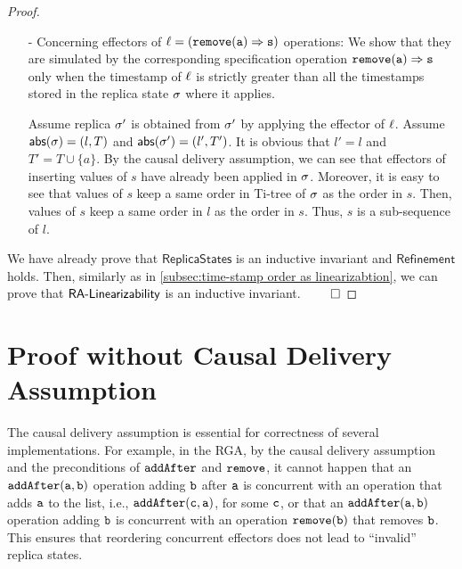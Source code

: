\begin {proof}
\begin{itemize}
\item[-] Concerning effectors of $\alabel = (\alabellong[{\tt remove}]{a}{s}{})$ operations: We show that they are simulated by the corresponding specification operation $\alabellong[{\tt remove}]{a}{s}{}$ only when the timestamp of $\ell$ is strictly greater than all the timestamps stored in the replica state $\sigma$ where it applies.

    Assume replica $\sigma'$ is obtained from $\sigma'$ by applying the effector of $\ell$. Assume $\mathsf{abs}(\sigma) = (l,T)$ and $\mathsf{abs}(\sigma') = (l',T')$. It is obvious that $l' = l$ and $T' = T \cup \{ a \}$. By the causal delivery assumption, we can see that effectors of inserting values of $s$ have already been applied in $\sigma$. Moreover, it is easy to see that values of $s$ keep a same order in Ti-tree of $\sigma$ as the order in $s$. Then, values of $s$ keep a same order in $l$ as the order in $s$. Thus, $s$ is a sub-sequence of $l$.
\end{itemize}

We have already prove that $\mathsf{ReplicaStates}$ is an inductive invariant and $\mathsf{Refinement}$ holds. Then, similarly as in \sectionautorefname \ref{subsec:time-stamp order as linearizabtion}, we can prove that $\mathsf{RA\text{-}Linearizability{}}$ is an inductive invariant. $\qed$
\end {proof}





\section{\crdtlin{} Proof without Causal Delivery Assumption}
\label{sec:RA-linearizability proof without causal delivery assumption}

The causal delivery assumption is essential for correctness of several implementations. For example, in the RGA, by the causal delivery assumption and the preconditions of ${\tt addAfter}$ and ${\tt remove}$, it cannot happen that an $\alabelshort[{\tt addAfter}]{a,b}$ operation adding ${\tt b}$ after ${\tt a}$ is concurrent with an operation that adds ${\tt a}$ to
the list, i.e., $\alabelshort[{\tt addAfter}]{c,a}$, for some ${\tt c}$, or that an $\alabelshort[{\tt addAfter}]{a,b}$ operation adding ${\tt b}$ is concurrent with an operation $\alabelshort[{\tt remove}]{b}$ that removes ${\tt b}$. This ensures that reordering concurrent effectors does not lead to ``invalid'' replica states. %

